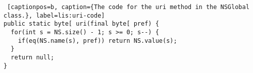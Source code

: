 \begin{lstlisting} [captionpos=b, caption={The code for the uri method in the NSGlobal class.}, label=lis:uri-code] 
public static byte[ uri(final byte[ pref) {
  for(int s = NS.size() - 1; s >= 0; s--) {
    if(eq(NS.name(s), pref)) return NS.value(s);
  }
  return null;
}
\end{lstlisting}
